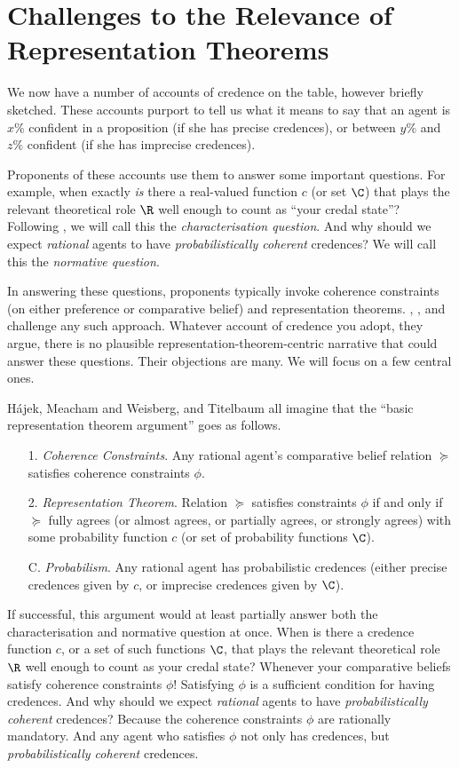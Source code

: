 \section{Challenges to the Relevance of Representation Theorems}\label{konek-sec-4}

We now have a number of accounts of credence on the table, however briefly sketched. These accounts purport to tell us what it means to say that an agent is $x\%$ confident in a proposition (if she has precise credences), or between $y\%$ and $z\%$ confident (if she has imprecise credences).

Proponents of these accounts use them to answer some important questions. For example, when exactly \textit{is} there a real-valued function $c$ (or set $\C$) that plays the relevant theoretical role $\R$ well enough to count as ``your credal state''? Following \citet{Meacham2011}, we will call this the \textit{characterisation question}. And why should we expect \textit{rational} agents to have \textit{probabilistically coherent} credences? We will call this the \textit{normative question}.

In answering these questions, proponents typically invoke coherence constraints (on either preference or comparative belief) and representation theorems. \citet{Hajek2009b}, \citet{Meacham2011}, and \citet{Titelbaum2015} challenge any such approach. Whatever account of credence you adopt, they argue, there is no plausible representation-theorem-centric narrative that could answer these questions. Their objections are many. We will focus on a few central ones.

H\'ajek, Meacham and Weisberg, and Titelbaum all imagine that the ``basic representation theorem argument'' goes as follows.
\begin{enumerate}
\item[1.] \textit{Coherence Constraints}. Any rational agent's comparative belief relation $\succeq$ satisfies coherence constraints $\phi$. 
\item[2.] \textit{Representation Theorem}. Relation $\succeq$ satisfies constraints $\phi$ if and only if $\succeq$ fully agrees (or almost agrees, or partially agrees, or strongly agrees) with some probability function $c$ (or set of probability functions $\C$).
\item[C.] \textit{Probabilism}. Any rational agent has probabilistic credences (either precise credences given by $c$, or imprecise credences given by $\C$).
\end{enumerate}
If successful, this argument would at least partially answer both the characterisation and normative question at once. When is there a credence function $c$, or a set of such functions $\C$, that plays the relevant theoretical role $\R$ well enough to count as your credal state? Whenever your comparative beliefs satisfy coherence constraints $\phi$! Satisfying $\phi$ is a sufficient condition for having credences. And why should we expect \textit{rational} agents to have \textit{probabilistically coherent} credences? Because the coherence constraints $\phi$ are rationally mandatory. And any agent who satisfies $\phi$ not only has credences, but \textit{probabilistically coherent} credences.

